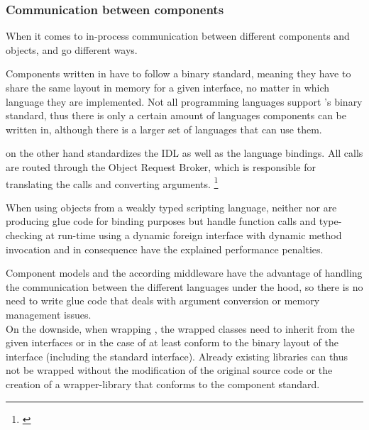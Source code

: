\subsubsection{Communication between components}

When it comes to in-process communication between different components and objects,  and  go different ways. 

Components written in  have to follow a binary standard, meaning they have to share the same layout in memory for a given interface, no matter in which language they are implemented. Not all programming languages support 's binary standard, thus there is only a certain amount of languages  components can be written in, although there is a larger set of languages that can use them.

 on the other hand standardizes the IDL as well as the language bindings. All calls are routed through the Object Request Broker, which is responsible for translating the calls and converting arguments. \footnote{\citep[83]{ComponentTechnology}}

When using objects from a weakly typed scripting language, neither  nor  are producing glue code for binding purposes but handle function calls and type-checking at run-time using a dynamic foreign interface with dynamic method invocation and in consequence have the explained performance penalties.

Component models and the according middleware have the advantage of handling the communication between the different languages under the hood, so there is no need to write glue code that deals with argument conversion or memory management issues.\\
On the downside, when wrapping , the wrapped classes need to inherit from the given interfaces or in the case of  at least conform to the binary layout of the interface (including the standard  interface). Already existing libraries can thus not be wrapped without the modification of the original source code or the creation of a wrapper-library that conforms to the component standard.


